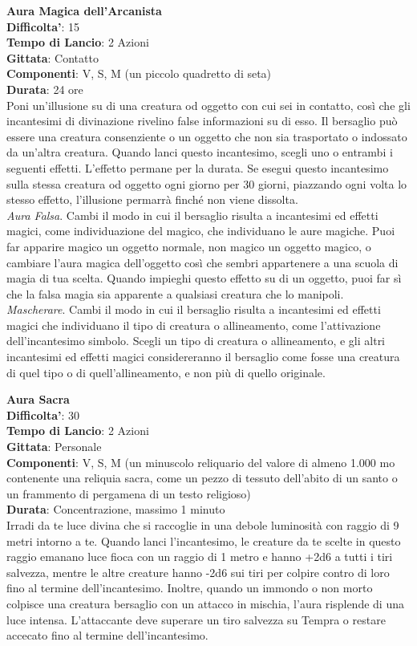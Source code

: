\begin{multicols}{2}
\medskip\textbf{Aura Magica dell’Arcanista}\\
\textbf{Difficolta'}: 15\\
\textbf{Tempo di Lancio}: 2 Azioni\\
\textbf{Gittata}: Contatto\\
\textbf{Componenti}: V, S, M (un piccolo quadretto di seta)\\
\textbf{Durata}: 24 ore\\
Poni un’illusione su di una creatura od oggetto con cui sei in contatto, così che gli incantesimi di divinazione rivelino false informazioni su di esso. Il bersaglio può essere una creatura consenziente o un oggetto che non sia trasportato o indossato da un’altra creatura. Quando lanci questo incantesimo, scegli uno o entrambi i seguenti effetti. L’effetto permane per la durata. Se esegui questo incantesimo sulla stessa creatura od oggetto ogni giorno per 30 giorni, piazzando ogni volta lo stesso effetto, l’illusione permarrà finché non viene dissolta.\\
\textit{Aura Falsa}. Cambi il modo in cui il bersaglio risulta a incantesimi ed effetti magici, come individuazione del magico, che individuano le aure magiche. Puoi far apparire magico un oggetto normale, non magico un oggetto magico, o cambiare l’aura magica dell’oggetto così che sembri appartenere a una scuola di magia di tua scelta. Quando impieghi questo effetto su di un oggetto, puoi far sì che la falsa magia sia apparente a qualsiasi creatura che lo manipoli.\\ \textit{Mascherare}. Cambi il modo in cui il bersaglio risulta a incantesimi ed effetti magici che individuano il tipo di creatura o allineamento, come l’attivazione dell’incantesimo simbolo. Scegli un tipo di creatura o allineamento, e gli altri incantesimi ed effetti magici considereranno il bersaglio come fosse una creatura di quel tipo o di quell’allineamento, e non più di quello originale.

\medskip\textbf{Aura Sacra}\\
\textbf{Difficolta'}: 30\\
\textbf{Tempo di Lancio}: 2 Azioni\\
\textbf{Gittata}: Personale\\
\textbf{Componenti}: V, S, M (un minuscolo reliquario del valore di almeno 1.000 mo contenente una reliquia sacra, come un pezzo di tessuto dell’abito di un santo o un frammento di pergamena di un testo religioso)\\
\textbf{Durata}: Concentrazione, massimo 1 minuto\\
Irradi da te luce divina che si raccoglie in una debole luminosità con raggio di 9 metri intorno a te. Quando lanci l’incantesimo, le creature da te scelte in questo raggio emanano luce fioca con un raggio di 1 metro e hanno {+2d6} a tutti i tiri salvezza, mentre le altre creature hanno {-2d6} sui tiri per colpire contro di loro fino al termine dell’incantesimo. Inoltre, quando un immondo o non morto colpisce una creatura bersaglio con un attacco in mischia, l’aura risplende di una luce intensa. L’attaccante deve superare un tiro salvezza su Tempra o restare accecato fino al termine dell’incantesimo.


\end{multicols}
